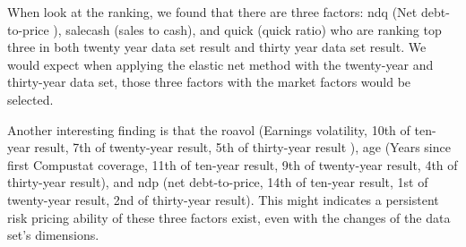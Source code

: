 When look at the ranking, we found that there are three factors: ndq (Net debt-to-price ), salecash (sales to cash), and quick (quick ratio) who are ranking top three in both twenty year data set result and thirty year data set result.
We would expect when applying the elastic net method with the twenty-year and thirty-year data set, those three factors with the market factors would be selected.

Another interesting finding is that the roavol (Earnings volatility, 10th of ten-year result, 7th of twenty-year result, 5th of thirty-year result ), age (Years since first Compustat coverage, 11th of ten-year result, 9th of twenty-year result, 4th of thirty-year result), and ndp (net debt-to-price, 14th of ten-year result, 1st of twenty-year result, 2nd of thirty-year result).
This might indicates a persistent risk pricing ability of these three factors exist, even with the changes of the data set's dimensions.

